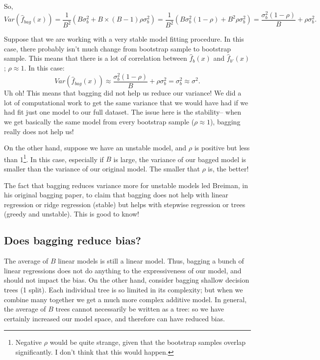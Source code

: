 So, 
$$
Var\left(\hat{f}_{bag}(x)\right) = \frac{1}{B^2} \left(B \sigma_b^2 + B \times (B-1) \rho \sigma_b^2 \right) = \frac{1}{B^2} \left(B \sigma_b^2 (1 - \rho) + B^2 \rho \sigma_b^2  \right)  = \frac{\sigma_b^2 (1 - \rho)}{B} + \rho \sigma_b^2.
$$

Suppose that we are working with a very stable model fitting procedure. In this case, there probably isn't much change from bootstrap sample to bootstrap sample. This means that there is a lot of correlation between $\hat{f}_b(x)$ and $\hat{f}_{b'}(x)$; $\rho \approx 1$. In this case: 
$$
Var\left(\hat{f}_{bag}(x)\right) \approx \frac{\sigma_b^2 (1 - \rho)}{B} + \rho \sigma_b^2 = \sigma_b^2 \approx \sigma^2. 
$$
Uh oh! This means that bagging did not help us reduce our variance! We did a lot of computational work to get the same variance that we would have had if we had fit just one model to our full dataset. The issue here is the stability-- when we get basically the same model from every bootstrap sample ($\rho \approx 1$), bagging really does not help us!

On the other hand, suppose we have an unstable model, and $\rho$ is positive but less than 1\footnote{Negative $\rho$ would be quite strange, given that the bootstrap samples overlap significantly. I don't think that this would happen.}. In this case, especially if $B$ is large, the variance of our bagged model is smaller than the variance of our original model. The smaller that $\rho$ is, the better! 

The fact that bagging reduces variance more for unstable models led Breiman, in his original bagging paper, to claim that bagging does not help with linear regression or ridge regression (stable) but helps with stepwise regression or trees (greedy and unstable). This is good to know!

\subsection{Does bagging reduce bias?}

The average of $B$ linear models is still a linear model. Thus, bagging a bunch of linear regressions does not do anything to the expressiveness of our model, and should not impact the bias. On the other hand, consider bagging shallow decision trees (1 split). Each individual tree is so limited in its complexity; but when we combine many together we get a much more complex additive model. In general, the average of $B$ trees cannot necessarily be written as a tree: so we have certainly increased our model space, and therefore can have reduced bias. 

